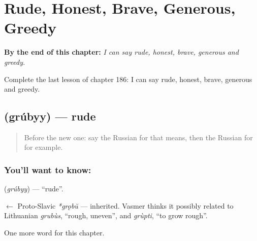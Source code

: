 
\chapter{Rude, Honest, Brave, Generous, Greedy}
\label{ch:ru-rude-honest-brave-generous-greedy}

\begin{chapteropening}
\textbf{By the end of this chapter:} \emph{I can say rude, honest, brave, generous and greedy.}

Complete the last lesson of chapter 186: I can say rude, honest, brave, generous and greedy.
\end{chapteropening}

\section[\texorpdfstring{\ru{грубый} (grúbyy)}{грубый (grúbyy)}]{ (grúbyy) — rude}

\label{lesson:RU-C186-grubyy}



\begin{quote}
Before the new one: say the Russian for that means, then the Russian for for example.
\end{quote}

\subsection*{You'll want to know: }
\textbf{} (\emph{grúbyy}) — \textquotedblleft{}rude\textquotedblright{}.

\begin{cousinweb}
\textbf{} $\leftarrow$ Proto-Slavic \emph{*grǫbŭ} — inherited. Vasmer thinks it possibly related to Lithuanian \emph{grubùs}, \textquotedblleft{}rough, uneven\textquotedblright{}, and \emph{grùpti}, \textquotedblleft{}to grow rough\textquotedblright{}.
\end{cousinweb}

\begin{grammarlens}[title={What you've built}]
One more word for this chapter.
\end{grammarlens}

